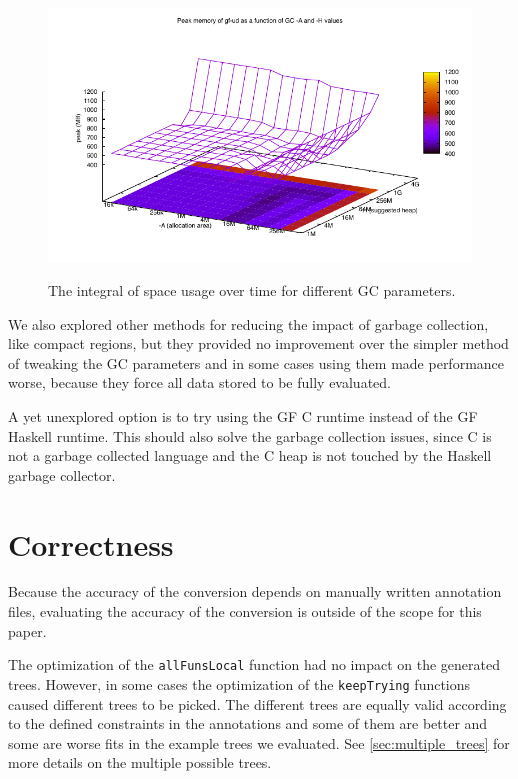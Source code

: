 \begin{figure}
      {\includegraphics[scale=0.5]{thesis/figure/gf-ud-peak-gc-space.pdf}}
    \caption{The integral of space usage over time for different GC parameters.}
    \label{fig:gf-ud-integ-gc-space}
\end{figure}

We also explored other methods for reducing the impact of garbage collection, like compact regions\cite{yang2015efficient}, but they provided no improvement over the simpler method of tweaking the GC parameters and in some cases using them made performance worse, because they force all data stored to be fully evaluated.

\clearpage
A yet unexplored option is to try using the GF C runtime instead of the GF Haskell runtime. This should also solve the garbage collection issues, since C is not a garbage collected language and the C heap is not touched by the Haskell garbage collector.

\section{Correctness}

Because the accuracy of the conversion depends on manually written annotation files, evaluating the accuracy of the conversion is outside of the scope for this paper.

The optimization of the \texttt{allFunsLocal} function had no impact on the generated trees. However, in some cases the optimization of the \texttt{keepTrying} functions caused different trees to be picked. The different trees are equally valid according to the defined constraints in the annotations and some of them are better and some are worse fits in the example trees we evaluated. See \autoref{sec:multiple_trees} for more details on the multiple possible trees.

